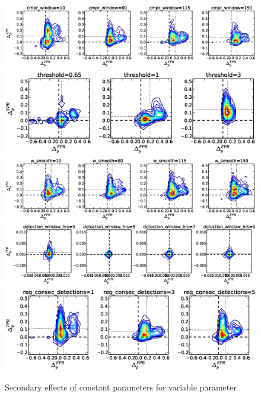 \begin{figure}[!h]
\begin{center}
\includegraphics[width=6in]{../fig/final/delta_hist_sec/gamma/cmpr_window}
\includegraphics[width=6in]{../fig/final/delta_hist_sec/gamma/threshold}
\includegraphics[width=6in]{../fig/final/delta_hist_sec/gamma/w_smooth}
\includegraphics[width=6in]{../fig/final/delta_hist_sec/cmpr_window/detection_window_hrs}
\includegraphics[width=6in]{../fig/final/delta_hist_sec/gamma/req_consec_detections}
\end{center}
\caption{\label{fig:delta_sec1} Secondary effects of constant parameters for variable parameter }
\end{figure}

